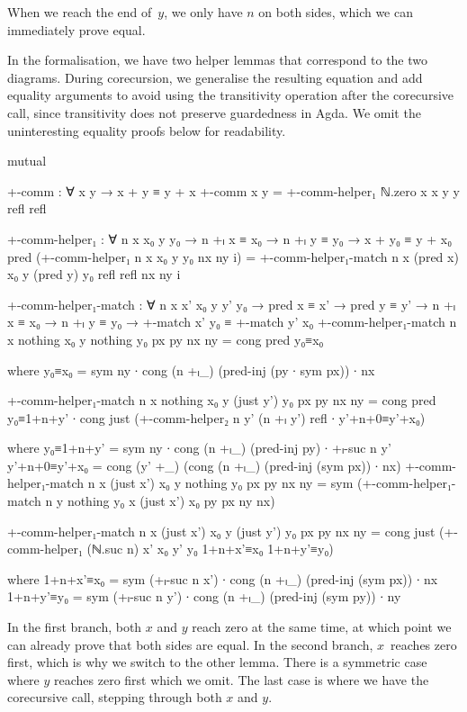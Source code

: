 When we reach the end of~$y$, we only have $n$ on both sides, which we can
immediately prove equal.

In the formalisation, we have two helper lemmas that correspond to the two
diagrams. During corecursion, we generalise the resulting equation and add
equality arguments to avoid using the transitivity operation after the
corecursive call, since transitivity does not preserve guardedness in Agda. We omit
the uninteresting equality proofs below for readability.
\begin{AgdaSuppressSpace}
\begin{code}[hide]
mutual
\end{code}
\begin{code}
  +-comm : ∀ x y → x + y ≡ y + x
  +-comm x y = +-comm-helper₁ ℕ.zero x x y y refl refl

  +-comm-helper₁ :
    ∀ n x x₀ y y₀ → n +ₗ x ≡ x₀ → n +ₗ y ≡ y₀ →
    x + y₀ ≡ y + x₀
  pred (+-comm-helper₁ n x x₀ y y₀ nx ny i) =
    +-comm-helper₁-match n x (pred x) x₀ y (pred y) y₀
      refl refl nx ny i

  +-comm-helper₁-match :
    ∀ n x x' x₀ y y' y₀ →
    pred x ≡ x' → pred y ≡ y' →
    n +ₗ x ≡ x₀ → n +ₗ y ≡ y₀ →
    +-match x' y₀ ≡ +-match y' x₀
  +-comm-helper₁-match
    n x nothing x₀ y nothing y₀ px py nx ny =
      cong pred y₀≡x₀
\end{code}
\begin{code}[hide]
      where
      y₀≡x₀ = sym ny ∙ cong (n +ₗ_) (pred-inj (py ∙ sym px)) ∙ nx
\end{code}
\begin{code}
  +-comm-helper₁-match
    n x nothing x₀ y (just y') y₀ px py nx ny =
      cong pred y₀≡1+n+y' ∙
      cong just
        (+-comm-helper₂ n y' (n +ₗ y') refl ∙ y'+n+0≡y'+x₀)
\end{code}
\begin{code}[hide]
    where
    y₀≡1+n+y' = sym ny ∙ cong (n +ₗ_) (pred-inj py) ∙ +ₗ-suc n y'
    y'+n+0≡y'+x₀ = cong (y' +_) (cong (n +ₗ_) (pred-inj (sym px)) ∙ nx)
  +-comm-helper₁-match
    n x (just x') x₀ y nothing y₀ px py nx ny =
      sym (+-comm-helper₁-match n y nothing y₀ x (just x') x₀ py px ny nx)
\end{code}
\begin{code}
  +-comm-helper₁-match
    n x (just x') x₀ y (just y') y₀ px py nx ny =
      cong just
        (+-comm-helper₁ (ℕ.suc n) x' x₀ y' y₀
          1+n+x'≡x₀ 1+n+y'≡y₀)
\end{code}
\begin{code}[hide]
    where
    1+n+x'≡x₀ = sym (+ₗ-suc n x') ∙ cong (n +ₗ_) (pred-inj (sym px)) ∙ nx
    1+n+y'≡y₀ = sym (+ₗ-suc n y') ∙ cong (n +ₗ_) (pred-inj (sym py)) ∙ ny
\end{code}
\end{AgdaSuppressSpace}
In the first branch, both $x$ and $y$ reach zero at the same time, at which
point we can already prove that both sides are equal. In the second branch,
$x$~reaches zero first, which is why we switch to the other lemma. There is a
symmetric case where $y$ reaches zero first which we omit. The last case is
where we have the corecursive call, stepping through both $x$ and $y$.

